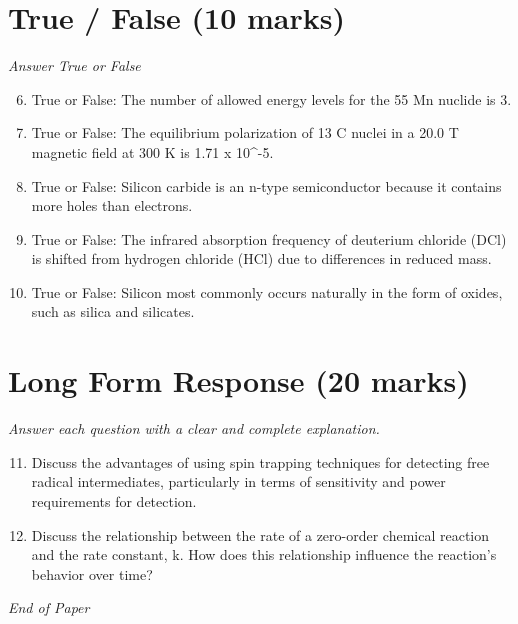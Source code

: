 \documentclass[12pt]{article}
\begin{document}
\section*{True / False (10 marks)}
\textit{Answer True or False}
\begin{enumerate}[label=\arabic*.]
\setcounter{enumi}{5}
\item True or False: The number of allowed energy levels for the 55 Mn nuclide is 3.
\item True or False: The equilibrium polarization of 13 C nuclei in a 20.0 T magnetic field at 300 K is 1.71 x 10^-5.
\item True or False: Silicon carbide is an n-type semiconductor because it contains more holes than electrons.
\item True or False: The infrared absorption frequency of deuterium chloride (DCl) is shifted from hydrogen chloride (HCl) due to differences in reduced mass.
\item True or False: Silicon most commonly occurs naturally in the form of oxides, such as silica and silicates.
\end{enumerate}

\section*{Long Form Response (20 marks)}
\textit{Answer each question with a clear and complete explanation.}
\begin{enumerate}[label=\arabic*.]
\setcounter{enumi}{10}
\item Discuss the advantages of using spin trapping techniques for detecting free radical intermediates, particularly in terms of sensitivity and power requirements for detection.
\item Discuss the relationship between the rate of a zero-order chemical reaction and the rate constant, k. How does this relationship influence the reaction's behavior over time?
\end{enumerate}

\vfill
\noindent\textit{End of Paper}
\end{document}
